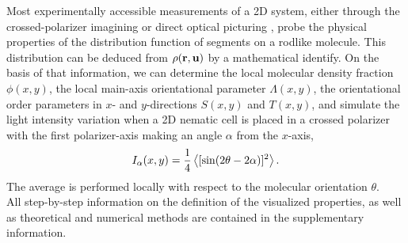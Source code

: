 \documentclass[prl,twocolumn,preprintnumbers,reprint]{revtex4}
\newcommand{\bu}{{\bf u}}
\newcommand{\br}{{\bf r}}
\begin{document}


 Most experimentally accessible measurements of a 2D system, either through the crossed-polarizer imagining \cite{Tkachenko1995} or direct optical picturing \cite{Galanis2006,Mulder2011,Lewis2014,Cortes2017},  probe the physical properties of the distribution function of segments on a rodlike molecule.
This distribution can be deduced from $\rho(\br,\bu)$ by a mathematical identify. On the basis of that information, we can determine the local molecular density fraction $\phi(x,y)$, the local main-axis orientational parameter $\Lambda(x,y)$, the orientational order parameters in $x$- and $y$-directions $S(x,y)$ and $T(x,y)$, and simulate the light intensity variation when a 2D nematic cell is placed in a crossed polarizer with the first polarizer-axis making an angle $\alpha$ from the $x$-axis,
\begin{equation}\label{Idef}
I_\alpha(x,y) = {1\over 4}\left< [\sin(2\theta-2\alpha)]^2 \right >.
\end{equation}
The average is performed locally with respect to the molecular orientation $\theta$.\\

 All step-by-step information on the definition of the visualized properties,  as well as theoretical and numerical methods are contained in the supplementary information.\\




\end{document}
